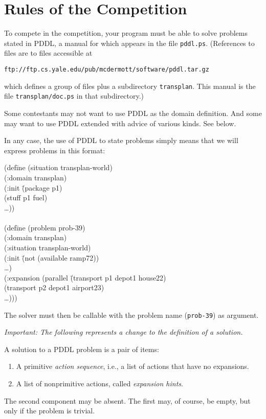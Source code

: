 \documentclass{article}
\newenvironment{tabtt}{\begin{tt}\begin{tabbing}}{\end{tabbing}\end{tt}}
\begin{document}
\section{Rules of the Competition}
\label{sec:phases}

To compete in the competition, your program must be able to solve
problems stated in PDDL, a manual for which appears in the file
{\tt pddl.ps}.  (References to files are to files accessible at
\begin{center}
\tt ftp://ftp.cs.yale.edu/pub/mcdermott/software/pddl.tar.gz
\end{center}
which defines a group of files plus a subdirectory {\tt transplan}.
This manual is the file {\tt transplan/doc.ps} in that subdirectory.)

Some contestants may not want to use PDDL as the domain
definition.  And some may want to use PDDL extended with advice of
various kinds.  See below.

In any case, the use of PDDL to state problems simply means that we
will express problems in this format:
\begin{tabtt}
(def\=ine (situation transplan-world) \+\\
   (:domain transplan) \\
   (:init \=(package p1) \+\\
            (stuff p1 fuel) \\
            \ldots)) \-\-\\
\\
(def\=ine (problem prob-39) \+\\
   (:domain transplan) \\
   (:situation transplan-world) \\
   (:init \= (not (available ramp72)) \+\\
          \ldots) \-\\
   (:expansion (parallel \=(transport p1 depot1 house22) \+\\
                           (transport p2 depot1 airport23) \\
                          \ldots)))
\end{tabtt}   

The solver must then be callable with the problem name ({\tt prob-39})
as argument.

{\em Important: The following represents a change to the definition of
a solution.}

A solution to a PDDL problem is a pair of items:
\begin{enumerate}
\item A primitive {\em action sequence}, i.e., a list of actions that have
no expansions.
\item A list of nonprimitive actions, called {\em expansion hints}.
\end{enumerate}
The second component may be absent.  The first may, of course, be
empty, but only if the problem is trivial.
\end{document}
